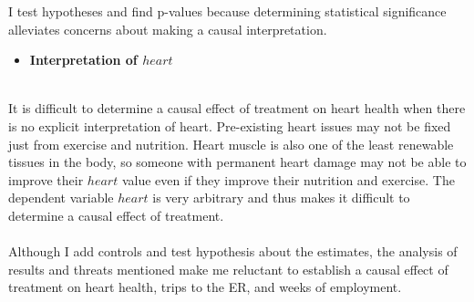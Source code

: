 \documentclass[a4paper]{article}
\begin{document}
I test hypotheses and find p-values because determining statistical significance alleviates concerns about making a causal interpretation.

\begin{itemize}
\item \textbf{Interpretation of $heart$}
\end{itemize}
\\
It is difficult to determine a causal effect of treatment on heart health when there is no explicit interpretation of heart. Pre-existing heart issues may not be fixed just from exercise and nutrition. Heart muscle is also one of the least renewable tissues in the body, so someone with permanent heart damage may not be able to improve their $heart$ value even if they improve their nutrition and exercise. The dependent variable $heart$ is very arbitrary and thus makes it difficult to determine a causal effect of treatment. 
\\
\vspace{2mm}
\\
Although I add controls and test hypothesis about the estimates, the analysis of results and threats mentioned make me reluctant to establish a causal effect of treatment on heart health, trips to the ER, and weeks of employment. 


\vspace{2mm}
\end{document}
